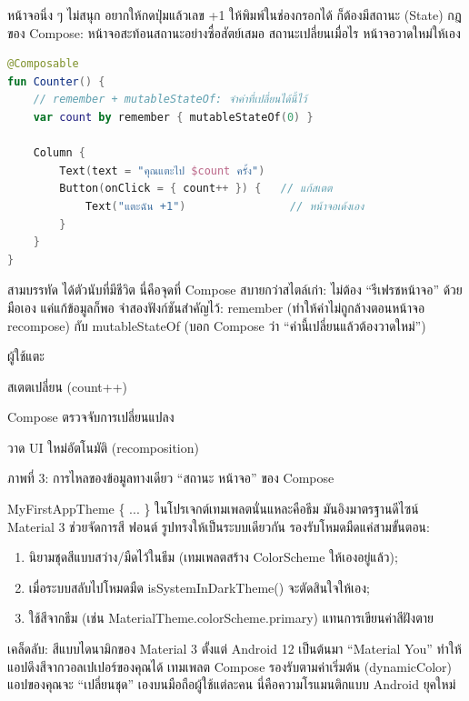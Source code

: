
หน้าจอนิ่ง ๆ ไม่สนุก อยากให้กดปุ่มแล้วเลข +1 ให้พิมพ์ในช่องกรอกได้ ก็ต้องมีสถานะ (State) กฎของ Compose: หน้าจอสะท้อนสถานะอย่างซื่อสัตย์เสมอ สถานะเปลี่ยนเมื่อไร หน้าจอวาดใหม่ให้เอง

\begin{lstlisting}[language=Kotlin]
@Composable
fun Counter() {
    // remember + mutableStateOf: จำค่าที่เปลี่ยนได้นี้ไว้
    var count by remember { mutableStateOf(0) }

    Column {
        Text(text = "คุณแตะไป $count ครั้ง")
        Button(onClick = { count++ }) {   // แก้สเตต
            Text("แตะฉัน +1")                // หน้าจอเด้งเอง
        }
    }
}
\end{lstlisting}

สามบรรทัด ได้ตัวนับที่มีชีวิต นี่คือจุดที่ Compose สบายกว่าสไตล์เก่า: ไม่ต้อง “รีเฟรชหน้าจอ” ด้วยมือเอง แค่แก้ข้อมูลก็พอ จำสองฟังก์ชันสำคัญไว้: remember (ทำให้ค่าไม่ถูกล้างตอนหน้าจอ recompose) กับ mutableStateOf (บอก Compose ว่า “ค่านี้เปลี่ยนแล้วต้องวาดใหม่”)

ผู้ใช้แตะ

สเตตเปลี่ยน (count++)

Compose ตรวจจับการเปลี่ยนแปลง

วาด UI ใหม่อัตโนมัติ (recomposition)

\begin{center}\small\color{gray}ภาพที่ 3: การไหลของข้อมูลทางเดียว “สถานะ หน้าจอ” ของ Compose\end{center}


MyFirstAppTheme \{ ... \} ในโปรเจกต์เทมเพลตนั่นแหละคือธีม มันอิงมาตรฐานดีไซน์ Material 3 ช่วยจัดการสี ฟอนต์ รูปทรงให้เป็นระบบเดียวกัน รองรับโหมดมืดแค่สามขั้นตอน:

\begin{enumerate}
  \item นิยามชุดสีแบบสว่าง/มืดไว้ในธีม (เทมเพลตสร้าง ColorScheme ให้เองอยู่แล้ว);
  \item เมื่อระบบสลับไปโหมดมืด isSystemInDarkTheme() จะตัดสินใจให้เอง;
  \item ใช้สีจากธีม (เช่น MaterialTheme.colorScheme.primary) แทนการเขียนค่าสีฝังตาย
\end{enumerate}

\begin{tcbinfo}{เคล็ดลับ: สีแบบไดนามิกของ Material 3}
ตั้งแต่ Android 12 เป็นต้นมา “Material You” ทำให้แอปดึงสีจากวอลเปเปอร์ของคุณได้ เทมเพลต Compose รองรับตามค่าเริ่มต้น (dynamicColor) แอปของคุณจะ “เปลี่ยนชุด” เองบนมือถือผู้ใช้แต่ละคน นี่คือความโรแมนติกแบบ Android ยุคใหม่

\end{tcbinfo}

